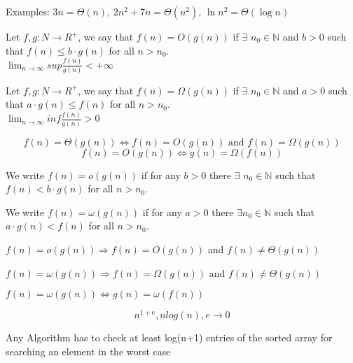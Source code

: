     Examples: $3n = \Theta(n)$, $2n^2 + 7n = \Theta(n^2)$, $\ln n^2 = \Theta(\log n)$
\begin{definition}{}
    Let $f,g: N \rightarrow R^+$, we say that $f(n)=O(g(n))$ if $\exists$ $n_0\in \mathbb{N} $ and $b>0$  such that $f(n) \leq b \cdot g(n)$ for all $n > n_0$.
    \\ $\lim_{n \rightarrow \infty}sup \frac{f(n)}{g(n)} < + \infty $   
\end{definition}
\begin{definition}{}
    Let $f,g: N \rightarrow R^+$, we say that $f(n)=\Omega(g(n))$ if $\exists$ $n_0\in \mathbb{N} $ and $a>0$  such that $a\cdot g(n)\leq  f(n)  $ for all $n > n_0$.
\\ $\lim_{n \rightarrow \infty}inf \frac{f(n)}{g(n)} >0$
\end{definition}
\begin{remark}{}{}
    $$f(n)=\Theta(g(n)) \Leftrightarrow f(n)=O(g(n)) \text{ and } f(n)=\Omega(g(n))$$
$$f(n)=O(g(n)) \Leftrightarrow g(n)=\Omega(f(n))$$
\end{remark}
\begin{definition}{}
    We write $f(n)=o(g(n))$ if for any $b>0$ there $\exists$ $n_0\in\mathbb{N}$ such that $f(n)<b\cdot g(n)$ for all $n>n_0$.
    \end{definition}
\begin{definition}{}
    We write $f(n)=\omega(g(n))$ if for any $a>0$ there $\exists n_0\in\mathbb{N}$ such that $a\cdot g(n)<f(n)$ for all $n>n_0$.
    
\end{definition}
\begin{remark}{}{}
    $f(n)=o(g(n))\Rightarrow f(n)=O(g(n))$ and $f(n)\neq\Theta(g(n))$

$f(n)=\omega(g(n))\Rightarrow f(n)=\Omega(g(n))$ and $f(n)\neq\Theta(g(n))$

$f(n)=\omega(g(n))\Leftrightarrow g(n)=\omega(f(n))$

\end{remark}
$$
    n^{1+\mathrm{e}} , nlog(n) , e \to 0
$$ 
\begin{theorem}{}{}
Any Algorithm has to check at least log(n+1) entries of the sorted array for searching an element in the worst case
\end{theorem}

